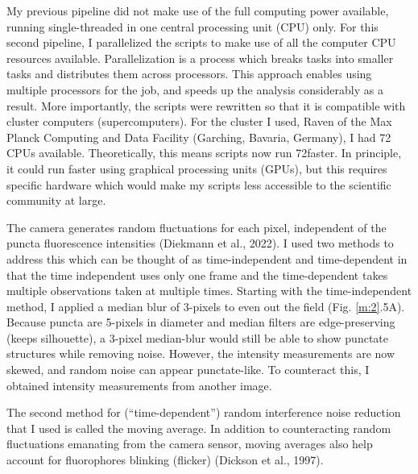My previous pipeline did not make use of the full computing power available, running single-threaded in one central processing unit (CPU) only. For this second pipeline, I parallelized the scripts to make use of all the computer CPU resources available. Parallelization is a process which breaks tasks into smaller tasks and distributes them across processors. This approach enables using multiple processors for the job, and speeds up the analysis considerably as a result. More importantly, the scripts were rewritten so that it is compatible with cluster computers (supercomputers). For the cluster I used, Raven of the Max Planck Computing and Data Facility (Garching, Bavaria, Germany), I had 72 CPUs available. Theoretically, this means scripts now run 72\times faster. In principle, it could run faster using graphical processing units (GPUs), but this requires specific hardware which would make my scripts less accessible to the scientific community at large.

The camera generates random fluctuations for each pixel, independent of the puncta fluorescence intensities (Diekmann et al., 2022). I used two methods to address this which can be thought of as time-independent and time-dependent in that the time independent uses only one frame and the time-dependent takes multiple observations taken at multiple times. Starting with the time-independent method, I applied a median blur of 3-pixels to even out the field (Fig. \ref{m:2}.5A). Because puncta are 5-pixels in diameter and median filters are edge-preserving (keeps silhouette), a 3-pixel median-blur would still be able to show punctate structures while removing noise. However, the intensity measurements are now skewed, and random noise can appear punctate-like. To counteract this, I obtained intensity measurements from another image.

The second method for (“time-dependent”) random interference noise reduction that I used is called the moving average. In addition to counteracting random fluctuations emanating from the camera sensor, moving averages also help account for fluorophores blinking (flicker) (Dickson et al., 1997).

